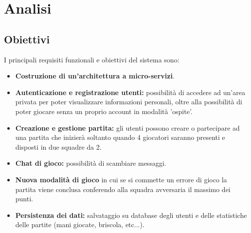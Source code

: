 \chapter{Analisi}
\label{ch:analisi} %
\section{Obiettivi}
I principali requisiti funzionali e obiettivi del sistema sono:

\begin{itemize}
    \item \textbf{Costruzione di un'architettura a micro-servizi}.

    \item \textbf{Autenticazione e registrazione utenti: } possibilità di accedere ad un'area privata per poter visualizzare informazioni personali, oltre alla possibilità di poter giocare senza un proprio account in modalità 'ospite'.
    \item \textbf{Creazione e gestione partita: } gli utenti possono creare o partecipare ad una partita che inizierà soltanto quando 4 giocatori saranno presenti e disposti in due squadre da 2.

    \item \textbf{Chat di gioco: } possibilità di scambiare messaggi.

    \item \textbf{Nuova modalità di gioco} in cui se si commette un errore di gioco la partita viene conclusa conferendo alla squadra avversaria il massimo dei punti.

    \item \textbf{Persistenza dei dati: } salvataggio su database degli utenti e delle statistiche delle partite (mani giocate, briscola, etc...).
\end{itemize}
